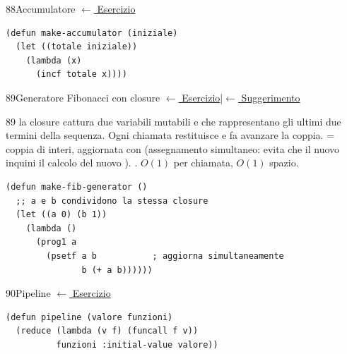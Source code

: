 \label{sol:88}
\begin{solbox}{88}{Accumulatore}
\small\color{black!55}\hyperref[ex:88]{$\leftarrow$ Esercizio}\normalsize\color{black}
\begin{lstlisting}
(defun make-accumulator (iniziale)
  (let ((totale iniziale))
    (lambda (x)
      (incf totale x))))
\end{lstlisting}
\end{solbox}

\label{sol:89}
\begin{solbox}{89}{Generatore Fibonacci con closure}
\small\color{black!55}\hyperref[ex:89]{$\leftarrow$ Esercizio}\enspace\textcolor{black!30}{|}\enspace\hyperref[hint:89]{$\leftarrow$ Suggerimento}\normalsize\color{black}
\begin{ragionamentoBox}{89}
 la closure cattura due variabili mutabili  e 
che rappresentano gli ultimi due termini della sequenza.
Ogni chiamata restituisce  e fa avanzare la coppia.
  = coppia di interi, aggiornata con 
(assegnamento simultaneo: evita che il nuovo  inquini il calcolo del nuovo ).
 .
 $O(1)$ per chiamata, $O(1)$ spazio.
\end{ragionamentoBox}
\begin{lstlisting}
(defun make-fib-generator ()
  ;; a e b condividono la stessa closure
  (let ((a 0) (b 1))
    (lambda ()
      (prog1 a
        (psetf a b           ; aggiorna simultaneamente
               b (+ a b))))))
\end{lstlisting}
\end{solbox}

\label{sol:90}
\begin{solbox}{90}{Pipeline}
\small\color{black!55}\hyperref[ex:90]{$\leftarrow$ Esercizio}\normalsize\color{black}
\begin{lstlisting}
(defun pipeline (valore funzioni)
  (reduce (lambda (v f) (funcall f v))
          funzioni :initial-value valore))
\end{lstlisting}
\end{solbox}

